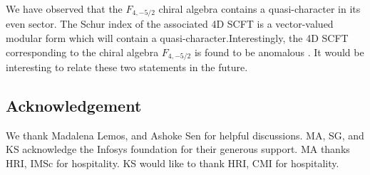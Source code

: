 \documentclass[a4paper,12pt]{article}
\begin{document}
We have observed that the $F_{4,-5/2}$ chiral algebra contains a quasi-character in its even sector. The Schur index of the associated 4D SCFT is a vector-valued modular form which will contain a quasi-character.Interestingly, the 4D SCFT corresponding to the chiral algebra $F_{4,-5/2}$ is found to be anomalous \cite{Shimizu:2017kzs}. It would be interesting to relate these two statements in the future.



\vspace{0.5cm}
 \subsection*{Acknowledgement}

We thank Madalena Lemos, and Ashoke Sen for helpful discussions. MA, SG, and KS acknowledge the Infosys foundation for their generous support. MA thanks HRI, IMSc for hospitality. KS would like to thank HRI, CMI for hospitality.




 \appendix
\end{document}
